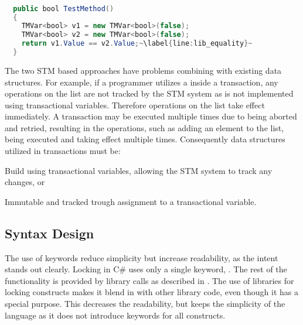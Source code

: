 \begin{lstlisting}[float, label=lst:lib_implicit_conversion,
  caption={Equality comparison of \bscode{TMVar<bool>}},
  language=Java,  
  showspaces=false,
  showtabs=false,
  breaklines=true,
  showstringspaces=false,
  breakatwhitespace=true,
  escapechar=~,
  commentstyle=\color{greencomments},
  keywordstyle=\color{bluekeywords},
  stringstyle=\color{redstrings},
  morekeywords={atomic, retry, orelse, var, get, set, ref, out, bool}]  % Start your code-block

  public bool TestMethod()
  {
    TMVar<bool> v1 = new TMVar<bool>(false);
    TMVar<bool> v2 = new TMVar<bool>(false);
    return v1.Value == v2.Value;~\label{line:lib_equality}~
  }
\end{lstlisting}

The two \ac{STM} based approaches have problems combining with existing data structures. For example, if a programmer utilizes a  inside a transaction, any operations on the list are not tracked by the \ac{STM} system as  is not implemented using transactional variables. Therefore operations on the list take effect immediately. A transaction may be executed multiple times due to being aborted and retried, resulting in the operations, such as adding an element to the list, being executed and taking effect multiple times. Consequently data structures utilized in transactions must be: \begin{inparaenum}
  \item Build using transactional variables, allowing the \ac{STM} system to track any changes, or
  \item Immutable and tracked trough assignment to a transactional variable.
\end{inparaenum}  

\subsection{Syntax Design}\label{subsec:syntaxdesign}
The use of keywords reduce simplicity but increase readability, as the intent stands out clearly\cite[p. 12-13]{sebestaProLang}. Locking in C\# uses only a single keyword, . The rest of the functionality is provided by library calls as described in . The use of libraries for locking constructs makes it blend in with other library code, even though it has a special purpose. This decreases the readability, but keeps the simplicity of the language as it does not introduce keywords for all constructs. 

